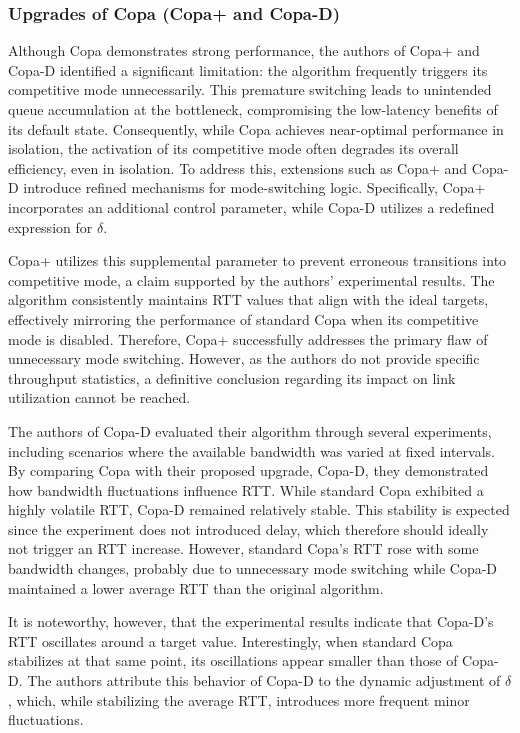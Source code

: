 \documentclass[conference]{IEEEtran}
\begin{document}
\subsubsection{Upgrades of Copa (Copa+ and Copa-D)}

Although Copa demonstrates strong performance, the authors of Copa+ and Copa-D identified a significant limitation: the algorithm frequently triggers its competitive mode unnecessarily. 
This premature switching leads to unintended queue accumulation at the bottleneck, compromising the low-latency benefits of its default state. 
Consequently, while Copa achieves near-optimal performance in isolation, the activation of its competitive mode often degrades its overall efficiency, even in isolation. 
To address this, extensions such as Copa+ and Copa-D introduce refined mechanisms for mode-switching logic. 
Specifically, Copa+ incorporates an additional control parameter, while Copa-D utilizes a redefined expression for $\delta$.

Copa+ utilizes this supplemental parameter to prevent erroneous transitions into competitive mode, a claim supported by the authors' experimental results. 
The algorithm consistently maintains RTT values that align with the ideal targets, effectively mirroring the performance of standard Copa when its competitive mode is disabled. 
Therefore, Copa+ successfully addresses the primary flaw of unnecessary mode switching. 
However, as the authors do not provide specific throughput statistics, a definitive conclusion regarding its impact on link utilization cannot be reached.

The authors of Copa-D evaluated their algorithm through several experiments, including scenarios where the available bandwidth was varied at fixed intervals. 
By comparing Copa with their proposed upgrade, Copa-D, they demonstrated how bandwidth fluctuations influence RTT. 
While standard Copa exhibited a highly volatile RTT, Copa-D remained relatively stable. 
This stability is expected since the experiment does not introduced delay, which therefore should ideally not trigger an RTT increase.
However, standard Copa's RTT rose with some bandwidth changes, probably due to unnecessary mode switching while Copa-D maintained a lower average RTT than the original algorithm.

It is noteworthy, however, that the experimental results indicate that Copa-D's RTT oscillates around a target value. 
Interestingly, when standard Copa stabilizes at that same point, its oscillations appear smaller than those of Copa-D. 
The authors attribute this behavior of Copa-D to the dynamic adjustment of $\delta$, which, while stabilizing the average RTT, introduces more frequent minor fluctuations.
\end{document}
